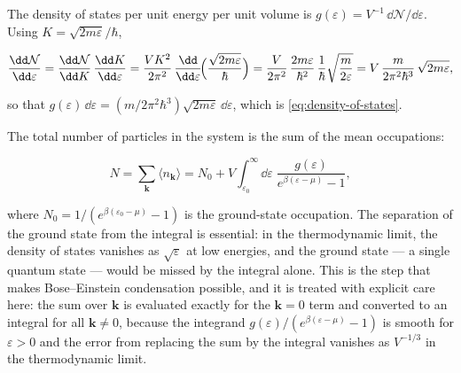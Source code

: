 The density of states per unit energy per unit volume is $g(\varepsilon) = V^{-1}\,\dd\mathcal{N}/\dd\varepsilon$. Using $K = \sqrt{2m\varepsilon}/\hbar$,
\begin{linenomath}
    \begin{equation*}
        \frac{\dd\mathcal{N}}{\dd\varepsilon}
        = \frac{\dd\mathcal{N}}{\dd K}\,\frac{\dd K}{\dd\varepsilon}
        = \frac{V K^2}{2\pi^2}\,
          \frac{\dd}{\dd\varepsilon}\!\Bigl(\frac{\sqrt{2m\varepsilon}}{\hbar}\Bigr)
        = \frac{V}{2\pi^2}\,\frac{2m\varepsilon}{\hbar^2}\,
          \frac{1}{\hbar}\sqrt{\frac{m}{2\varepsilon}}
        = V\,\frac{m}{2\pi^2\hbar^3}\,\sqrt{2m\varepsilon},
    \end{equation*}
\end{linenomath}
so that $g(\varepsilon)\,\dd\varepsilon = (m/2\pi^2\hbar^3)\sqrt{2m\varepsilon}\,\dd\varepsilon$, which is \eqref{eq:density-of-states}.

The total number of particles in the system is the sum of the mean occupations:
\begin{linenomath}
    \begin{equation}
        N = \sum_{\bm k} \langle n_{\bm k} \rangle
          = N_0 + V\int_{\varepsilon_0}^{\infty}\!\dd\varepsilon\;
            \frac{g(\varepsilon)}{e^{\beta(\varepsilon - \mu)} - 1},
        \label{eq:be-n0-equation}
    \end{equation}
\end{linenomath}
where $N_0 = 1/(e^{\beta(\varepsilon_0 - \mu)} - 1)$ is the ground-state occupation. The separation of the ground state from the integral is essential: in the thermodynamic limit, the density of states vanishes as $\sqrt{\varepsilon}$ at low energies, and the ground state --- a single quantum state --- would be missed by the integral alone. This is the step that makes Bose--Einstein condensation possible, and it is treated with explicit care here: the sum over $\bm k$ is evaluated exactly for the $\bm k = 0$ term and converted to an integral for all $\bm k \neq 0$, because the integrand $g(\varepsilon)/(e^{\beta(\varepsilon-\mu)}-1)$ is smooth for $\varepsilon > 0$ and the error from replacing the sum by the integral vanishes as $V^{-1/3}$ in the thermodynamic limit.

